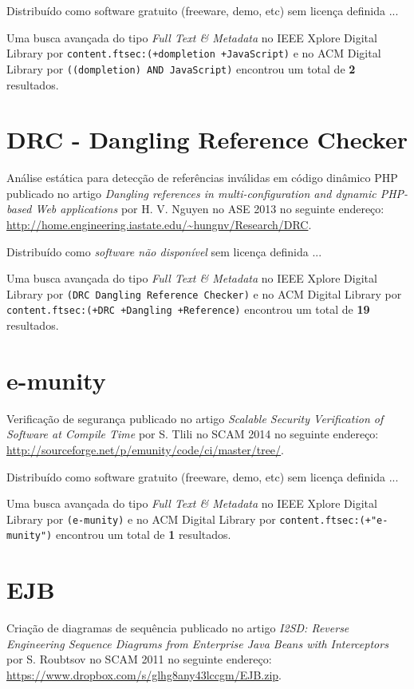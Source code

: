 Distribuído como software gratuito (freeware, demo, etc)
sem licença definida ...


Uma busca avançada do tipo {\it Full Text \& Metadata} no IEEE Xplore Digital Library por
\texttt{content.ftsec:(+dompletion +JavaScript)}
e no ACM Digital Library por
\texttt{((dompletion) AND JavaScript)}
encontrou um total de
{\bf 2}
resultados.

\section{DRC - Dangling Reference Checker}

Análise estática para detecção de referências inválidas em código dinâmico PHP
publicado no artigo
{\it Dangling references in multi-configuration and dynamic PHP-based Web applications}
por
H. V. Nguyen
no
ASE
2013
no seguinte endereço:
\url{http://home.engineering.iastate.edu/~hungnv/Research/DRC}.

Distribuído como {\it software não disponível}
sem licença definida ...


Uma busca avançada do tipo {\it Full Text \& Metadata} no IEEE Xplore Digital Library por
\texttt{(DRC Dangling Reference Checker)}
e no ACM Digital Library por
\texttt{content.ftsec:(+DRC +Dangling +Reference)}
encontrou um total de
{\bf 19}
resultados.

\section{e-munity}

Verificação de segurança
publicado no artigo
{\it Scalable Security Verification of Software at Compile Time}
por
S. Tlili
no
SCAM
2014
no seguinte endereço:
\url{http://sourceforge.net/p/emunity/code/ci/master/tree/}.

Distribuído como software gratuito (freeware, demo, etc)
sem licença definida ...


Uma busca avançada do tipo {\it Full Text \& Metadata} no IEEE Xplore Digital Library por
\texttt{(e-munity)}
e no ACM Digital Library por
\texttt{content.ftsec:(+"e-munity")}
encontrou um total de
{\bf 1}
resultados.

\section{EJB}

Criação de diagramas de sequência
publicado no artigo
{\it I2SD: Reverse Engineering Sequence Diagrams from Enterprise Java Beans with Interceptors}
por
S. Roubtsov
no
SCAM
2011
no seguinte endereço:
\url{https://www.dropbox.com/s/glhg8any43lccgm/EJB.zip}.

